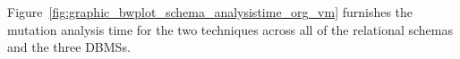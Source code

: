 
 Figure~\ref{fig:graphic_bwplot_schema_analysistime_org_vm}
furnishes the mutation analysis time for the two techniques across all of the relational schemas and the three DBMSs.




